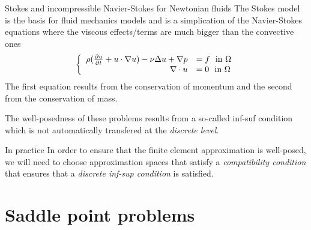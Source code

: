 \begin{block}{Stokes and incompressible Navier-Stokes for Newtonian fluids}
  The Stokes model is the basis for fluid mechanics models and is a
  simplication of the Navier-Stokes equations where the viscous effects/terms
  are much bigger than the convective ones
  \begin{equation}
    \label{eq:chmixte:3}
    \left\{\begin{array}[c]{rl}
           \rho( \frac{\partial u}{\partial t} + u \cdot \nabla u) - \nu \Delta u + \nabla p & = f\ \mbox{ in } \Omega\\
           \nabla \cdot u & = 0\ \mbox{ in } \Omega
         \end{array}\right.
     \end{equation}
     The first equation results from the conservation of momentum and the second
     from the conservation of mass.
   \end{block}

  \begin{remark}{}
    The well-posedness of these problems results from a so-called \alert{inf-suf
    condition} which is not automatically transfered at the \emph{discrete level}.
  \end{remark}

  \begin{remark}{In practice}
    In order to ensure that the finite element approximation is well-posed, we
    will need to choose approximation spaces that satisfy a \emph{compatibility
    condition} that ensures that a \emph{discrete inf-sup condition} is satisfied.
  \end{remark}

\section{Saddle point problems}
\label{sec:saddle-point-probl}

